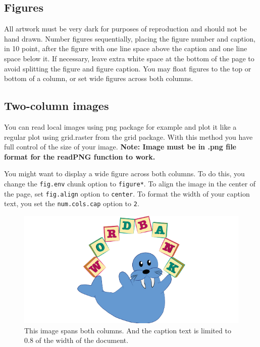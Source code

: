 \documentclass[10pt, letterpaper]{article}
\newenvironment{CodeChunk}{}{}
\begin{document}
\hypertarget{figures}{%
\subsection{Figures}\label{figures}}

All artwork must be very dark for purposes of reproduction and should
not be hand drawn. Number figures sequentially, placing the figure
number and caption, in 10 point, after the figure with one line space
above the caption and one line space below it. If necessary, leave extra
white space at the bottom of the page to avoid splitting the figure and
figure caption. You may float figures to the top or bottom of a column,
or set wide figures across both columns.

\hypertarget{two-column-images}{%
\subsection{Two-column images}\label{two-column-images}}

You can read local images using png package for example and plot it like
a regular plot using grid.raster from the grid package. With this method
you have full control of the size of your image. \textbf{Note: Image
must be in .png file format for the readPNG function to work.}

You might want to display a wide figure across both columns. To do this,
you change the \texttt{fig.env} chunk option to \texttt{figure*}. To
align the image in the center of the page, set \texttt{fig.align} option
to \texttt{center}. To format the width of your caption text, you set
the \texttt{num.cols.cap} option to \texttt{2}.

\begin{CodeChunk}
\begin{figure}[h]

{\centering \includegraphics{figs/2-col-image-1} 

}

\caption[This image spans both columns]{This image spans both columns. And the caption text is limited to 0.8 of the width of the document.}\label{fig:2-col-image}
\end{figure}
\end{CodeChunk}
\end{document}
